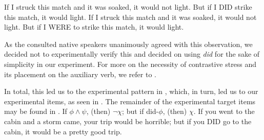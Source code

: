 \begin{minipage}{\linewidth}\pex{}
\a If I struck this match and it was soaked, it would not light. But if I \MakeUppercase{did} strike this match, it would light.
\a If I struck this match and it was soaked, it would not light. But if I \MakeUppercase{were} to strike this match, it would light.
\xe\end{minipage}
As the consulted native speakers unanimously agreed with this observation, we decided not to experimentally verify this and decided on using \textit{did} for the sake of simplicity in our experiment. For more on the necessity of contrastive stress and its placement on the auxiliary verb, we refer to .

    
In total, this led us to the experimental pattern in , which, in turn, led us to our experimental items, as seen in . The remainder of the experimental target items may be found in .
\ex {}
    If $\phi\land\psi$, (then) $\neg\chi$; but if did-$\phi$, (then) $\chi$.
\xe
\ex{}
    If you went to the cabin and a storm came, your trip would be horrible; but if you \MakeUppercase{did} go to the cabin, it would be a pretty good trip.
\xe

